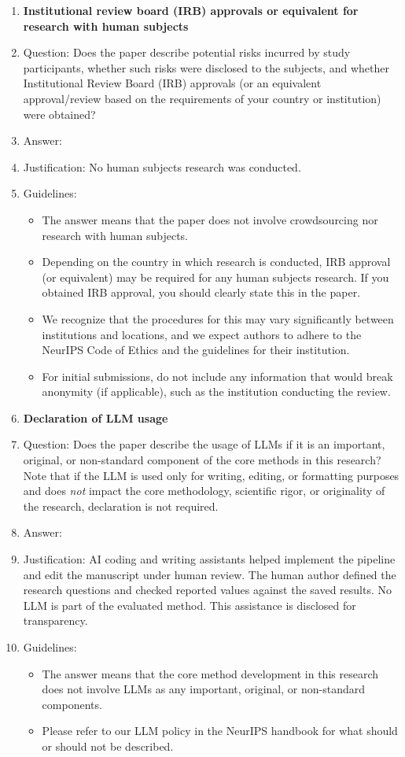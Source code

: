 \begin{enumerate}
\item {\bf Institutional review board (IRB) approvals or equivalent for research with human subjects}
    \item[] Question: Does the paper describe potential risks incurred by study participants, whether such risks were disclosed to the subjects, and whether Institutional Review Board (IRB) approvals (or an equivalent approval/review based on the requirements of your country or institution) were obtained?
    \item[] Answer: \answerNA{}
    \item[] Justification: No human subjects research was conducted.
    \item[] Guidelines:
    \begin{itemize}
        \item The answer \answerNA{} means that the paper does not involve crowdsourcing nor research with human subjects.
        \item Depending on the country in which research is conducted, IRB approval (or equivalent) may be required for any human subjects research. If you obtained IRB approval, you should clearly state this in the paper. 
        \item We recognize that the procedures for this may vary significantly between institutions and locations, and we expect authors to adhere to the NeurIPS Code of Ethics and the guidelines for their institution. 
        \item For initial submissions, do not include any information that would break anonymity (if applicable), such as the institution conducting the review.
    \end{itemize}

\item {\bf Declaration of LLM usage}
    \item[] Question: Does the paper describe the usage of LLMs if it is an important, original, or non-standard component of the core methods in this research? Note that if the LLM is used only for writing, editing, or formatting purposes and does \emph{not} impact the core methodology, scientific rigor, or originality of the research, declaration is not required.
    \item[] Answer: \answerYes{}
    \item[] Justification: AI coding and writing assistants helped implement the pipeline and edit the manuscript under human review. The human author defined the research questions and checked reported values against the saved results. No LLM is part of the evaluated method. This assistance is disclosed for transparency.
    \item[] Guidelines:
    \begin{itemize}
        \item The answer \answerNA{} means that the core method development in this research does not involve LLMs as any important, original, or non-standard components.
        \item Please refer to our LLM policy in the NeurIPS handbook for what should or should not be described.
    \end{itemize}

\end{enumerate}
